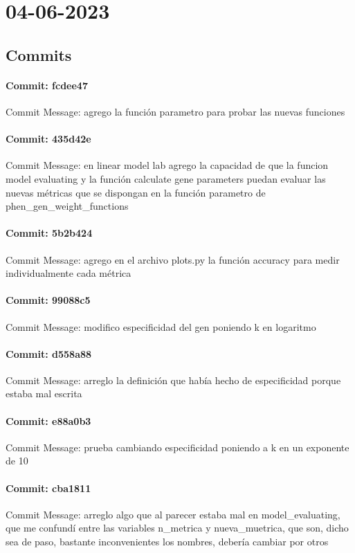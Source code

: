 \documentclass{article}
\begin{document}
\section{04-06-2023}
\subsection{Commits}
\paragraph{Commit: fcdee47}
Commit Message: agrego la función parametro para probar las nuevas funciones

\paragraph{Commit: 435d42e}
Commit Message: en linear model lab agrego la capacidad de que la funcion model evaluating y la función calculate gene parameters puedan evaluar las nuevas métricas que se dispongan en la función parametro de phen_gen_weight_functions

\paragraph{Commit: 5b2b424}
Commit Message: agrego en el archivo plots.py la función accuracy para medir individualmente cada métrica

\paragraph{Commit: 99088c5}
Commit Message: modifico especificidad del gen poniendo k en logaritmo

\paragraph{Commit: d558a88}
Commit Message: arreglo la definición que había hecho de especificidad porque estaba mal escrita

\paragraph{Commit: e88a0b3}
Commit Message: prueba cambiando especificidad poniendo a k en un exponente de 10

\paragraph{Commit: cba1811}
Commit Message: arreglo algo que al parecer estaba mal en model_evaluating, que me confundí entre las variables n_metrica y nueva_muetrica, que son, dicho sea de paso, bastante inconvenientes los nombres, debería cambiar por otros
\end{document}
